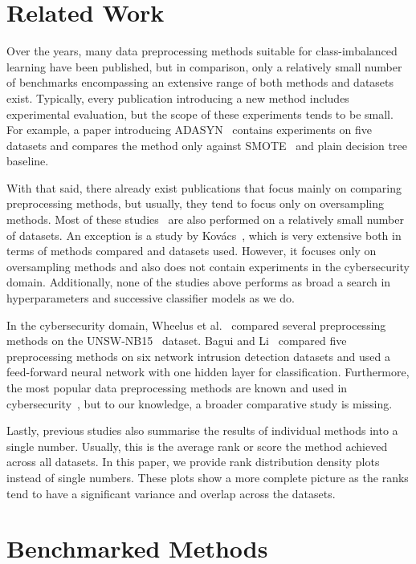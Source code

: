 \documentclass[conference]{IEEEtran}
\begin{document}
\section{Related Work}

Over the years, many data preprocessing methods suitable for class-imbalanced learning have been
published, but in comparison, only a relatively small number of benchmarks encompassing an
extensive range of both methods and datasets exist. Typically, every publication introducing a new
method includes experimental evaluation, but the scope of these experiments tends to be small. For
example, a paper introducing ADASYN~\cite{adasyn} contains experiments on five datasets and
compares the method only against SMOTE~\cite{smote} and plain decision tree baseline.

With that said, there already exist publications that focus mainly on comparing preprocessing
methods, but usually, they tend to focus only on oversampling methods. Most of these
studies~\cite{gosain2017, amin2016, barandela2004} are also performed on a relatively small number
of datasets. An exception is a study by Kovács~\cite{kovacs}, which is very extensive both in terms
of methods compared and datasets used. However, it focuses only on oversampling methods and also
does not contain experiments in the cybersecurity domain. Additionally, none of the studies above
performs as broad a search in hyperparameters and successive classifier models as we do.

In the cybersecurity domain, Wheelus et al.~\cite{wheelus2018} compared several preprocessing
methods on the UNSW-NB15~\cite{unsw} dataset. Bagui and Li~\cite{bagui2021} compared five
preprocessing methods on six network intrusion detection datasets and used a feed-forward neural
network with one hidden layer for classification. Furthermore, the most popular data preprocessing
methods are known and used in cybersecurity~\cite{ahsan2018, massaoudi2022, akash2022, soe2019,
azad2021}, but to our knowledge, a broader comparative study is missing.

Lastly, previous studies also summarise the results of individual methods into a single number.
Usually, this is the average rank or score the method achieved across all datasets. In this paper,
we provide rank distribution density plots instead of single numbers. These plots show a more
complete picture as the ranks tend to have a significant variance and overlap across the datasets.


\section{Benchmarked Methods}
\label{section:methods}
\end{document}
